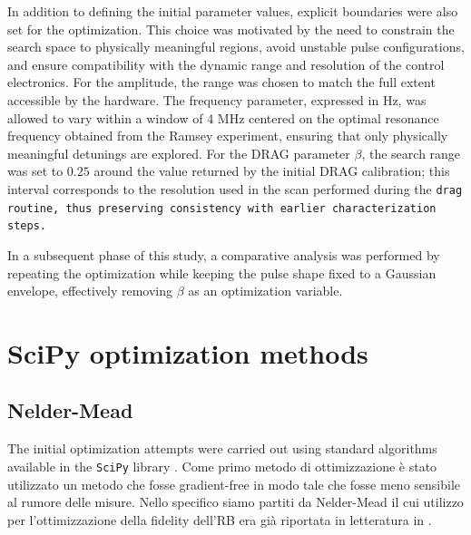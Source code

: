 In addition to defining the initial parameter values, explicit boundaries were also set for the optimization. 
This choice was motivated by the need to constrain the search space to physically meaningful regions, avoid unstable pulse configurations, and ensure compatibility with the dynamic range and resolution of the control electronics.
For the amplitude, the range was chosen to match the full extent accessible by the hardware. 
The frequency parameter, expressed in Hz, was allowed to vary within a window of 4 MHz centered on the optimal resonance frequency obtained from the Ramsey experiment, ensuring that only physically meaningful detunings are explored. 
For the DRAG parameter $\beta$, the search range was set to $0.25$ around the value returned by the initial DRAG calibration; this interval corresponds to the resolution used in the scan performed during the \tt{drag} routine, thus preserving consistency with earlier characterization steps.

In a subsequent phase of this study, a comparative analysis was performed by repeating the optimization while keeping the pulse shape fixed to a Gaussian envelope, effectively removing $\beta$ as an optimization variable. 


\section{SciPy optimization methods}\label{Sec:OptimizationMethods}

\subsection{Nelder-Mead}
The initial optimization attempts were carried out using standard algorithms available in the \texttt{SciPy} library \cite{SciPy-NMeth}.
Come primo metodo di ottimizzazione è stato utilizzato un metodo che fosse gradient-free in modo tale che fosse meno sensibile al rumore delle misure. 
Nello specifico siamo partiti da Nelder-Mead il cui utilizzo per l'ottimizzazione della fidelity dell'RB era già riportata in letteratura in \cite{kelly_optimal_2014}.

